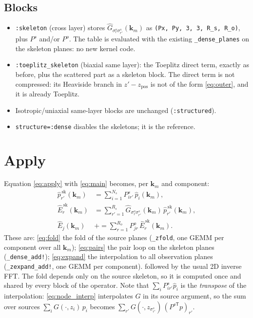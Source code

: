 \documentclass[11pt,a4paper]{article}
\newcommand{\code}[1]{\texttt{#1}}
\newcommand{\km}{\mathbf{k}_m}
\newcommand{\Ghat}{\widehat{G}}
\theoremstyle{remark}
\begin{document}
\subsection{Blocks}

\begin{itemize}[leftmargin=*]
\item \code{:skeleton} (cross layer) stores $\Ghat_{\sigma^o_r\sigma^s_{r'}}(\km)$ as \code{(Px, Py, 3, 3, R\_s, R\_o)}, plus $P^s$ and/or $P^o$.
  The table is evaluated with the existing \code{\_dense\_planes} on the skeleton planes: no new kernel code.
\item \code{:toeplitz\_skeleton} (biaxial same layer): the Toeplitz direct term, exactly as before, plus the scattered part as a
  skeleton block. The direct term is not compressed: its Heaviside branch in $z'-z_{\mathrm{pos}}$ is not of the form
  \eqref{eq:outer}, and it is already Toeplitz.
\item Isotropic/uniaxial same-layer blocks are unchanged (\code{:structured}).
\item \code{structure=:dense} disables the skeletons; it is the reference.
\end{itemize}

\section{Apply}
\label{sec:apply}

Equation \eqref{eq:apply} with \eqref{eq:main} becomes, per $\km$ and component:
\begin{align}
  \widehat{p}^{\,\mathrm{sk}}_{r'}(\km) &= \sum_{i=1}^{N_s} P^s_{ir'}\,\widehat p_i(\km), \label{eq:fold}\\
  \widehat{E}^{\,\mathrm{sk}}_{r}(\km) &= \sum_{r'=1}^{R_s} \Ghat_{\sigma^o_r\sigma^s_{r'}}(\km)\,\widehat{p}^{\,\mathrm{sk}}_{r'}(\km), \label{eq:pairs}\\
  \widehat{E}_j(\km) &\mathrel{+}= \sum_{r=1}^{R_o} P^o_{jr}\,\widehat{E}^{\,\mathrm{sk}}_r(\km). \label{eq:expand}
\end{align}
These are: \eqref{eq:fold} the fold of the source planes (\code{\_zfold}, one GEMM per component over all $\km$);
\eqref{eq:pairs} the pair loop on the skeleton planes (\code{\_dense\_add!}); \eqref{eq:expand} the interpolation to
all observation planes (\code{\_zexpand\_add!}, one GEMM per component).
followed by the usual 2D inverse FFT. The fold depends only on the source skeleton, so it is computed once and
shared by every block of the operator. Note that $\sum_i P^s_{ir'}\widehat p_i$ is the
\emph{transpose} of the interpolation: \eqref{eq:node_interp} interpolates $G$ in its source argument, so the sum over sources
$\sum_i G(\cdot,z_i)\,p_i$ becomes $\sum_{r'} G(\cdot,z_{\sigma^s_{r'}})\,(P^{s\mathsf T}p)_{r'}$.
\end{document}
